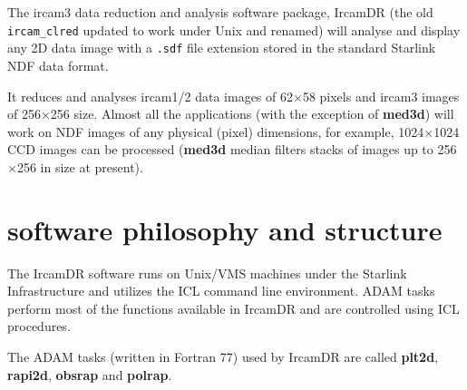 
The {\sc ircam3} data reduction and analysis software package, {\sc
IrcamDR} (the old {\tt ircam\_clred} updated to work under Unix 
and renamed) will analyse and display any 2D data image with a {\tt .sdf}
 file extension stored in the standard Starlink NDF data format.

It reduces and analyses {\sc ircam1/2} data images of 62$\times$58
pixels and {\sc ircam3} images of 256$\times$256 size.  Almost all the
applications (with the exception of {\bf med3d}) will work on NDF
images of any physical (pixel) dimensions, for example,
1024$\times$1024 CCD images can be processed ({\bf med3d} median
filters stacks of images up to 256$\times$256 in size at present).

 \newpage
 \begin{latexonly}
   \setlength{\parskip}{0mm}
   \latexonlytoc
   \setlength{\parskip}{\medskipamount}
 \end{latexonly}
\newpage
\renewcommand{\thepage}{\arabic{page}}
\setcounter{page}{1}

\section{\label{se:soft_structure} software philosophy and structure}

The {\sc IrcamDR} software runs on Unix/VMS machines under the Starlink
Infrastructure and utilizes the ICL command line environment.  {\sc ADAM}
tasks perform most of the functions available in {\sc IrcamDR} and are
controlled using ICL procedures.  

The {\sc ADAM} tasks (written in Fortran 77) used by {\sc IrcamDR} are
called {\bf plt2d}, {\bf rapi2d}, {\bf obsrap} and {\bf polrap}.  

